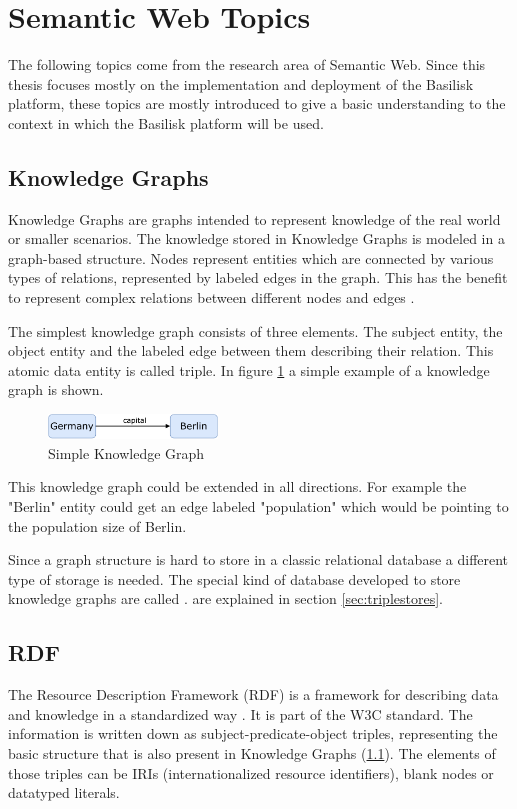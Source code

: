 \section{Semantic Web Topics}
\label{sec:sw_topics}
The following topics come from the research area of Semantic Web.
Since this thesis focuses mostly on the implementation and deployment of the Basilisk platform, these topics are mostly introduced to give a basic understanding to the context in which the Basilisk platform will be used.

\subsection{Knowledge Graphs} 
\label{sec:knowledge_graphs}
Knowledge Graphs are graphs intended to represent knowledge of the real world or smaller scenarios.
The knowledge stored in Knowledge Graphs is modeled in a graph-based structure. 
Nodes represent entities which are connected by various types of relations, represented by labeled edges in the graph.
This has the benefit to represent complex relations between different nodes and edges \cite{hoganKnowledgeGraphs2021}.

The simplest knowledge graph consists of three elements.
The subject entity, the object entity and the labeled edge between them describing their relation.
This atomic data entity is called triple.
In figure \ref{fig:example-knowledge-graph} a simple example of a knowledge graph is shown.

\begin{figure}[tbph]
	\centering
	\includegraphics[width=0.4\textwidth]{figures/knowledge-graph-diagram}
	\caption{Simple Knowledge Graph}
	\label{fig:example-knowledge-graph}
\end{figure}

This knowledge graph could be extended in all directions.
For example the "Berlin" entity could get an edge labeled "population" which would be pointing to the population size of Berlin.

Since a graph structure is hard to store in a classic relational database a different type of storage is needed.
The special kind of database developed to store knowledge graphs are called \tsp{}.
\tsp{} are explained in section \ref{sec:triplestores}.


\subsection{RDF}
\label{sec:rdf}
The Resource Description Framework (RDF) is a framework for describing data and knowledge in a standardized way \cite{RDFConceptsAbstract}. 
It is part of the W3C standard.
The information is written down as subject-predicate-object triples, representing the basic structure that is also present in Knowledge Graphs (\ref{sec:knowledge_graphs}).
The elements of those triples can be IRIs (internationalized resource identifiers), blank nodes or datatyped literals.

